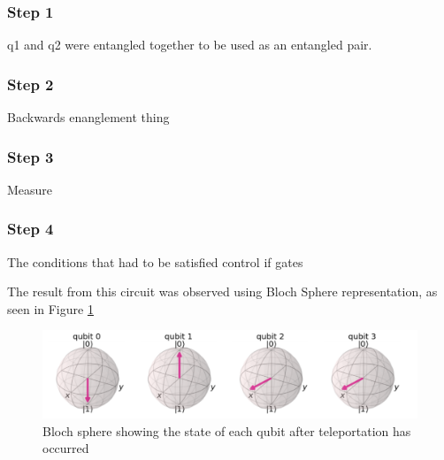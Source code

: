 \subsubsection{Step 1}
q1 and q2 were entangled together to be used as an entangled pair.

\subsubsection{Step 2}
Backwards enanglement thing

\subsubsection{Step 3}
Measure

\subsubsection{Step 4}
The conditions that had to be satisfied
control if gates

The result from this circuit was observed using Bloch Sphere representation, as seen in Figure \ref{fig:teleportBloch}
\begin{figure}[h]
    \centering
    \includegraphics[width=\textwidth]{lab3/images/teleportBloch.png}
    \caption{Bloch sphere showing the state of each qubit after teleportation has occurred}
    \label{fig:teleportBloch}
\end{figure}

